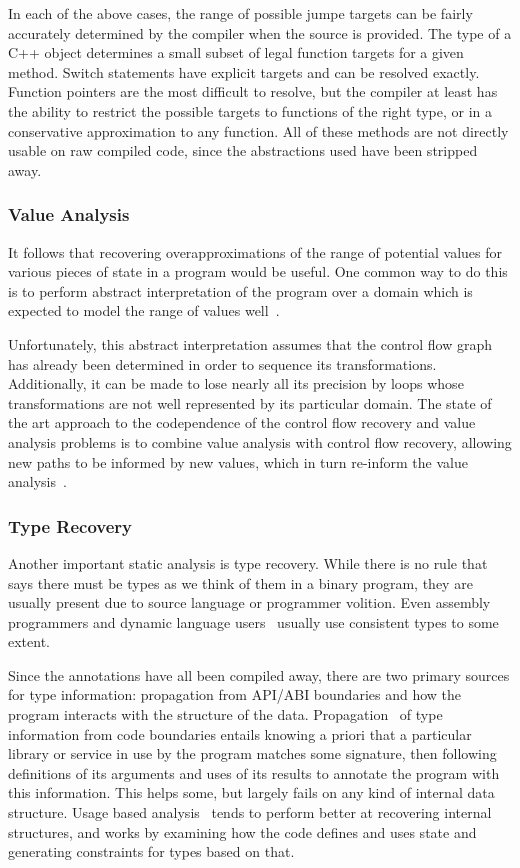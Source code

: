 In each of the above cases, the range of possible jumpe targets can be fairly accurately determined by the compiler when the source is provided.
The type of a C++ object determines a small subset of legal function targets for a given method.
Switch statements have explicit targets and can be resolved exactly.
Function pointers are the most difficult to resolve, but the compiler at least has the ability to restrict the possible targets to functions of the right type, or in a conservative approximation to any function.
All of these methods are not directly usable on raw compiled code, since the abstractions used have been stripped away.

\subsubsection{Value Analysis}
\label{sec:valanal}
It follows that recovering overapproximations of the range of potential values for various pieces of state in a program would be useful.
One common way to do this is to perform abstract interpretation of the program over a domain which is expected to model the range of values well~\cite{vsa,wrappedintervals,wrappedintervals2}.

Unfortunately, this abstract interpretation assumes that the control flow graph has already been determined in order to sequence its transformations.
Additionally, it can be made to lose nearly all its precision by loops whose transformations are not well represented by its particular domain.
The state of the art approach to the codependence of the control flow recovery and value analysis problems is to combine value analysis with control flow recovery, allowing new paths to be informed by new values, which in turn re-inform the value analysis~\cite{jakstab}.

\subsubsection{Type Recovery}
Another important static analysis is type recovery.
While there is no rule that says there must be types as we think of them in a binary program, they are usually present due to source language or programmer volition.
Even assembly programmers and dynamic language users~\cite{jsinfer} usually use consistent types to some extent.

Since the annotations have all been compiled away, there are two primary sources for type information: propagation from API/ABI boundaries and how the program interacts with the structure of the data.
Propagation~\cite{howard} of type information from code boundaries entails knowing a priori that a particular library or service in use by the program matches some signature, then following definitions of its arguments and uses of its results to annotate the program with this information.
This helps some, but largely fails on any kind of internal data structure.
Usage based analysis~\cite{tie,bitr} tends to perform better at recovering internal structures, and works by examining how the code defines and uses state and generating constraints for types based on that.

